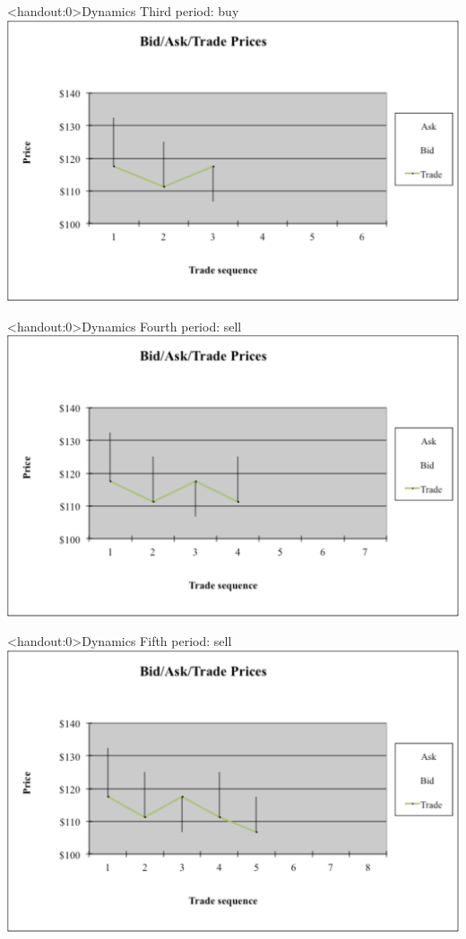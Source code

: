 \documentclass[english,10pt
,aspectratio=169
]{beamer}
\begin{document}
\begin{frame}<handout:0>{Dynamics}
	Third period: buy
	\center
	\includegraphics[width=0.9\linewidth]{pics/P3_Image.pdf}
\end{frame}


\begin{frame}<handout:0>{Dynamics}
	Fourth period: sell
	\center
	\includegraphics[width=0.9\linewidth]{pics/P4_Image.pdf}
\end{frame}


\begin{frame}<handout:0>{Dynamics}
	Fifth period: sell
	\center
	\includegraphics[width=0.9\linewidth]{pics/P5_Image.pdf}
\end{frame}
\end{document}
